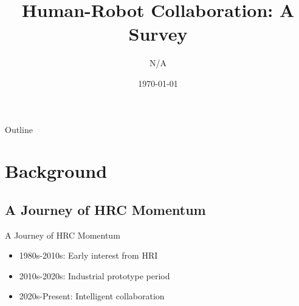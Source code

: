 \documentclass{beamer}
\title{Human-Robot Collaboration: A Survey}
\author{N/A}
\date{\today}
\begin{document}
\begin{frame}
\titlepage
{}
\end{frame}

\begin{frame}{Outline}
\tableofcontents[hideallsubsections]
\end{frame}

\section{Background}

\subsection{A Journey of HRC Momentum}
\begin{frame}{A Journey of HRC Momentum \cite{journey_hrc_momentum}}
\begin{itemize}
\item 1980s-2010s: Early interest from HRI \cite{An1989TheRO, 762539, 1087787, 760350, 6936985, DESANTIS2008253}
\vspace{10mm}
\item 2010s-2020s: Industrial prototype period \cite{MALIK2019665, Arash2017, GUIOCHET201743, 8107677, 9302892}
\vspace{10mm}
\item 2020s-Present: Intelligent collaboration \cite{Ji2024}
\end{itemize}
\end{frame}
\end{document}
